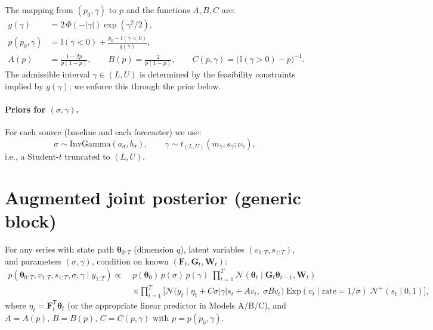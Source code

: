 \documentclass[11pt]{article}
\newcommand{\1}{\mathbb{I}}
\newcommand{\N}{\mathcal{N}}
\newcommand{\IG}{\mathrm{InvGamma}}
\newcommand{\Exp}{\mathrm{Exp}}
\newcommand{\T}{\mathsf{T}}
\newcommand{\PhiN}[1]{\Phi\!\left(#1\right)}
\begin{document}
The mapping from $(p_0,\gamma)$ to $p$ and the functions $A,B,C$ are:
\begin{align}
g(\gamma) &= 2\,\PhiN{-|\gamma|}\exp(\gamma^2/2), \\
p(p_0,\gamma) &= \1(\gamma<0) + \frac{p_0-\1(\gamma<0)}{g(\gamma)}, \\
A(p) &= \frac{1-2p}{p(1-p)},\qquad B(p)=\frac{2}{p(1-p)},\qquad C(p,\gamma)=\big(\1(\gamma>0)-p\big)^{-1}.
\end{align}
The admissible interval $\gamma\in(L,U)$ is determined by the feasibility constraints implied by $g(\gamma)$; we enforce this through the prior below.

\paragraph{Priors for $(\sigma,\gamma)$.}
For each source (baseline and each forecaster) we use:
\[
\sigma\sim \IG(a_\sigma,b_\sigma),
\qquad
\gamma\sim t_{(L,U)}(m_\gamma,s_\gamma;\nu_\gamma),
\]
i.e., a Student-$t$ truncated to $(L,U)$.

\section{Augmented joint posterior (generic block)}

For any series with state path $\bm\theta_{0:T}$ (dimension $q$), latent variables $(v_{1:T},s_{1:T})$, and parameters $(\sigma,\gamma)$, condition on known $(\bm F_t,\bm G_t,\bm W_t)$:
\begin{align}
p(\bm\theta_{0:T},v_{1:T},s_{1:T},\sigma,\gamma \mid y_{1:T})
\propto\;
&p(\bm\theta_0)\,p(\sigma)\,p(\gamma)\;\prod_{t=1}^T \N(\bm\theta_t\mid \bm G_t\bm\theta_{t-1},\bm W_t)\nonumber\\
&\times \prod_{t=1}^T \Big[
\N\!\big(y_t\mid \eta_t + C\sigma|\gamma|s_t + Av_t,\;\sigma B v_t\big)\;
\Exp(v_t\mid \text{rate}=1/\sigma)\;
\N^+(s_t\mid 0,1)\Big],\label{eq:joint_aug}
\end{align}
where $\eta_t=\bm F_t^\T\bm\theta_t$ (or the appropriate linear predictor in Models A/B/C),
and $A=A(p)$, $B=B(p)$, $C=C(p,\gamma)$ with $p=p(p_0,\gamma)$.
\end{document}
